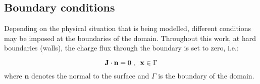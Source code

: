 \subsection{Boundary conditions}
Depending on the physical situation that is being modelled, different
conditions may be imposed at the boundaries of the domain. Throughout
this work, at hard boundaries (walls), the charge flux through the
boundary is set to zero, i.e.:

\begin{equation}
\mathbf{J} \cdot \mathbf{n} = 0 \;,\;\; \mathbf{x} \in \Gamma
\end{equation}
where $\mathbf{n}$ denotes the normal to the surface and $\Gamma$ is
the boundary of the domain. 





